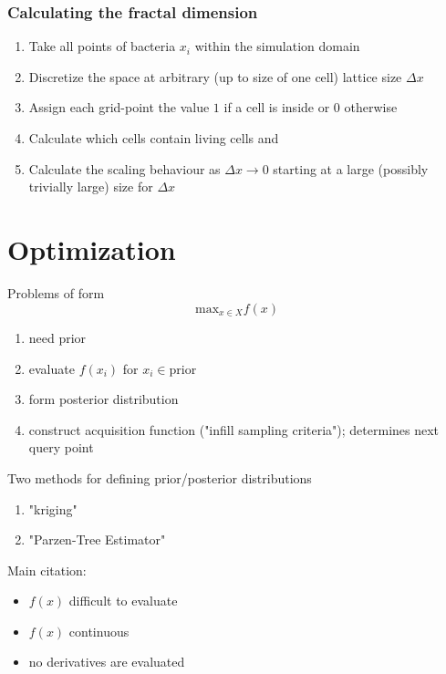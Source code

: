 \documentclass{article}
\begin{document}
\subsubsection{Calculating the fractal dimension}
\begin{enumerate}
    \item Take all points of bacteria $x_i$ within the simulation domain
    \item Discretize the space at arbitrary (up to size of one cell) lattice size $\Delta x$
    \item Assign each grid-point the value $1$ if a cell is inside or $0$ otherwise
    \item Calculate which cells contain living cells and
    \item Calculate the scaling behaviour as $\Delta x\rightarrow0$ starting at a large (possibly
        trivially large) size for $\Delta x$
\end{enumerate}

\section{Optimization}
\label{section:optimization}

Problems of form
\begin{equation}
    \text{max}_{x\in X} f(x)
\end{equation}

\begin{enumerate}
    \item need prior
    \item evaluate $f(x_i)$ for $x_i\in\text{prior}$
    \item form posterior distribution 
    \item construct acquisition function ("infill sampling criteria"); determines next query point
\end{enumerate}

Two methods for defining prior/posterior distributions
\begin{enumerate}
    \item "kriging"
    \item "Parzen-Tree Estimator"
\end{enumerate}

Main citation: \cite{Jones1998}
\begin{itemize}
    \item $f(x)$ difficult to evaluate
    \item $f(x)$ continuous
    \item no derivatives are evaluated
\end{itemize}
\end{document}
